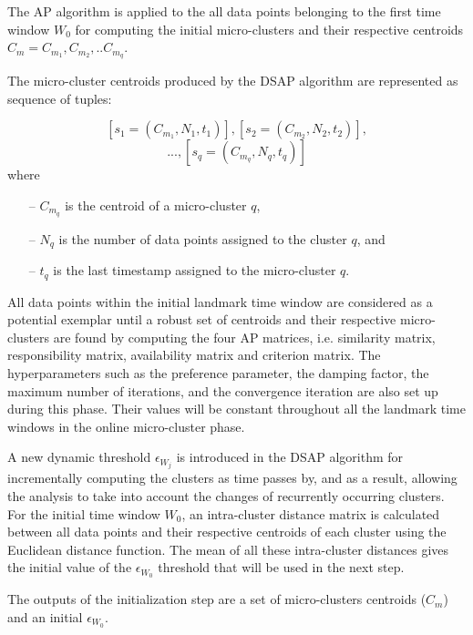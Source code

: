 The AP algorithm is applied to the all data points belonging to the first time window $W_0$ for computing the initial micro-clusters and their respective centroids $C_m = C_{m_1}, C_{m_2},..C_{m_q}$. 

The micro-cluster centroids produced by the DSAP algorithm are represented as sequence of tuples:
    
    \[    \left [  s_{1} =\left ( C_{m_1},N_{1},t_{1} \right )  \right ], \left [ s_{2} = \left ( C_{m_2},N_{2}, t_{2} \right ) \right ],\]
    \[...,\left [ s_q = \left ( C_{m_q}, N_q, t_{q} \right ) \right ] \]  
    where
    \begin{itemize}
        \item[--] $C_{m_q}$ is the centroid of a micro-cluster $q$,
        \item[--] $N_q$ is the number of data points assigned to the cluster $q$, and
        \item[--] $t_{q}$ is the last timestamp assigned to the micro-cluster $q$.
    \end{itemize}

All data points within the initial landmark time window are considered as a potential exemplar until a robust set of centroids and their respective micro-clusters are found by computing the four AP matrices, i.e. similarity matrix, responsibility matrix, availability matrix and criterion matrix. The hyperparameters such as the preference parameter, the damping factor, the maximum number of iterations, and the convergence iteration are also set up during this phase. Their values will be constant throughout all the landmark time windows in the online micro-cluster phase.

A new dynamic threshold $\epsilon_{W_j}$ is introduced in the DSAP algorithm for incrementally computing the clusters as time passes by, and as a result, allowing the analysis to take into account the changes of recurrently occurring clusters. For the initial time window $W_0$, an intra-cluster distance matrix is calculated between all data points and their respective centroids of each cluster using the Euclidean distance function. The mean of all these intra-cluster distances gives the initial value of the $\epsilon_{W_0}$ threshold that will be used in the next step.

The outputs of the initialization step are a set of micro-clusters centroids ($C_m$) and an initial $\epsilon_{W_0}$.


   
    
    
